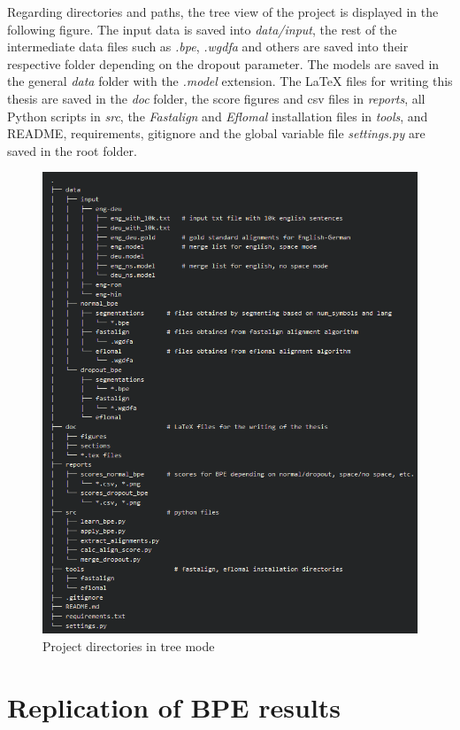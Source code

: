 Regarding directories and paths, the tree view of the project is displayed in the following figure. The input data is saved into \emph{data/input}, the rest of the intermediate data files such as \emph{.bpe}, \emph{.wgdfa} and others are saved into their respective folder depending on the dropout parameter. The models are saved in the general \emph{data} folder with the \emph{.model} extension. The LaTeX files for writing this thesis are saved in the \emph{doc} folder, the score figures and csv files in \emph{reports}, all Python scripts in \emph{src}, the \emph{Fastalign} and \emph{Eflomal} installation files in \emph{tools}, and README, requirements, gitignore and the global variable file \emph{settings.py} are saved in the root folder.

\begin{figure}[!ht]
    \centering
    \includegraphics[width=14cm]{figures/dir.png}
    \caption{Project directories in tree mode}
\end{figure}

\clearpage
\section{Replication of BPE results}

